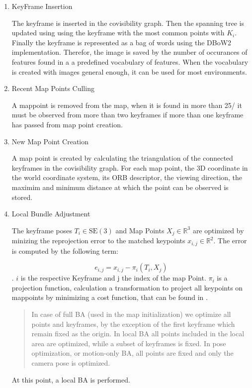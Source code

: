	
	\begin{enumerate}
	\item{KeyFrame Insertion}
	
	The keyframe is inserted in the covisibility graph. Then the spanning tree
	is updated using using the keyframe with the most common points with $K_i$.
	Finally the keyframe is represented as a bag of words using the DBoW2 implementation. 
	Therefor, the image is saved by the number of occurances of features found in a a predefined
	vocabulary of features. When the vocabulary is created with images general enough, 
	it can be used for most environments.
	

	
	\item{Recent Map Points Culling}
	
	A mappoint is removed from the map, when it is found in more than 
	25/%
	it must be observed from more than two keyframes if more than one keyframe 
	has passed from map point creation. 
	
	\item{New Map Point Creation}
	
	A map point is created by calculating the triangulation of the connected
	keyframes in the covisibility graph. For each map point, the 3D coordinate 
	in the world coordinate system, its ORB descriptor, the viewing direction, 
	the maximim and minimum distance at which the point can be observed is stored. 
	
	\item{Local Bundle Adjustment}
	
	The keyframe poses $T_i \in \text{SE}(3)$ and Map Points $X_j \in \mathbb{R}^{3}$ 
	are optimized by minizing the reprojection error to the matched keypoints $x_{i,j} \in \mathbb{R}^{2}$.
	The error is computed by the following term:
	
	$$ e_{i,j} = x_{i,j} - \pi_i\left(T_i, X_j\right) $$. 
	$i$ is the respective Keyframe and j the index of the map Point. 
	$\pi_i$ is a projection function, calculation a transformation 
	to project all keypoints on mappoints by minimizing a cost function, that
	can be found in \cite{ba}.
	\begin{quote}
	In case of full BA
	(used in the map initialization) we optimize
	all points and keyframes, by the exception of the first
	keyframe which remain fixed as the origin. In local BA
	all points included in the local area
	are optimized, while a subset of keyframes is fixed. In
	pose optimization, or motion-only BA, all
	points are fixed and only the camera pose is optimized.
	\end{quote}
	At this point, a local BA is performed.
	

\end{enumerate}
